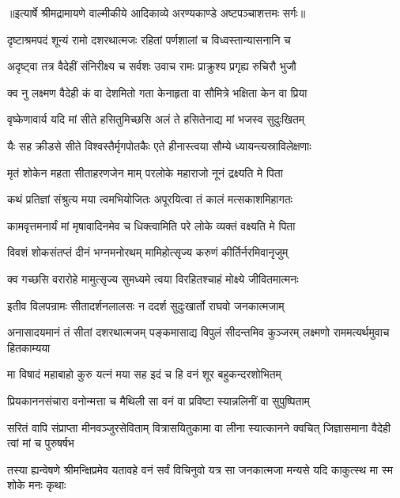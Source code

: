 {॥इत्यार्षे श्रीमद्रामायणे वाल्मीकीये आदिकाव्ये अरण्यकाण्डे अष्टपञ्चाशत्तमः सर्गः॥}


\twolineshloka
{दृष्टाश्रमपदं शून्यं रामो दशरथात्मजः}
{रहितां पर्णशालां च विध्वस्तान्यासनानि च} %

\twolineshloka
{अदृष्ट्वा तत्र वैदेहीं संनिरीक्ष्य च सर्वशः}
{उवाच रामः प्राक्रुश्य प्रगृह्य रुचिरौ भुजौ} %

\twolineshloka
{क्व नु लक्ष्मण वैदेही कं वा देशमितो गता}
{केनाहृता वा सौमित्रे भक्षिता केन वा प्रिया} %

\twolineshloka
{वृष्केणावार्य यदि मां सीते हसितुमिच्छसि}
{अलं ते हसितेनाद्य मां भजस्व सुदुःखितम्} %

\twolineshloka
{यैः सह क्रीडसे सीते विश्वस्तैर्मृगपोतकैः}
{एते हीनास्त्वया सौम्ये ध्यायन्त्यस्राविलेक्षणाः} %

\twolineshloka
{मृतं शोकेन महता सीताहरणजेन माम्}
{परलोके महाराजो नूनं द्रक्ष्यति मे पिता} %

\twolineshloka
{कथं प्रतिज्ञां संश्रुत्य मया त्वमभियोजितः}
{अपूरयित्वा तं कालं मत्सकाशमिहागतः} %

\twolineshloka
{कामवृत्तमनार्यं मां मृषावादिनमेव च}
{धिक्त्वामिति परे लोके व्यक्तं वक्ष्यति मे पिता} %

\twolineshloka
{विवशं शोकसंतप्तं दीनं भग्नमनोरथम्}
{मामिहोत्सृज्य करुणं कीर्तिर्नरमिवानृजुम्} %

\twolineshloka
{क्व गच्छसि वरारोहे मामुत्सृज्य सुमध्यमे}
{त्वया विरहितश्चाहं मोक्ष्ये जीवितमात्मनः} %

\twolineshloka
{इतीव विलपन्रामः सीतादर्शनलालसः}
{न ददर्श सुदुःखार्तो राघवो जनकात्मजाम्} %

\threelineshloka
{अनासादयमानं तं सीतां दशरथात्मजम्}
{पङ्कमासाद्य विपुलं सीदन्तमिव कुञ्जरम्}
{लक्ष्मणो राममत्यर्थमुवाच हितकाम्यया} %

\twolineshloka
{मा विषादं महाबाहो कुरु यत्नं मया सह}
{इदं च हि वनं शूर बहुकन्दरशोभितम्} %

\twolineshloka
{प्रियकाननसंचारा वनोन्मत्ता च मैथिली}
{सा वनं वा प्रविष्टा स्यान्नलिनीं वा सुपुष्पिताम्} %

\threelineshloka
{सरितं वापि संप्राप्ता मीनवञ्जुरसेविताम्}
{वित्रासयितुकामा वा लीना स्यात्कानने क्वचित्}
{जिज्ञासमाना वैदेही त्वां मां च पुरुषर्षभ} %

\threelineshloka
{तस्या ह्यन्वेषणे श्रीमन्क्षिप्रमेव यतावहे}
{वनं सर्वं विचिनुवो यत्र सा जनकात्मजा}
{मन्यसे यदि काकुत्स्थ मा स्म शोके मनः कृथाः} %

